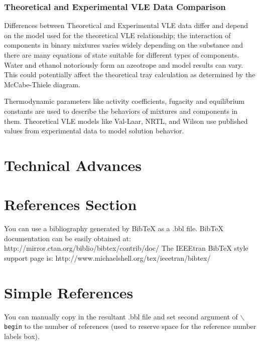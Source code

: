 \documentclass[lettersize,journal]{IEEEtran}
\begin{document}
\subsubsection{Theoretical and Experimental VLE Data Comparison}
Differences between Theoretical and Experimental VLE data differ and depend on the model used for the theoretical VLE relationship; the interaction of components in binary mixtures varies widely depending on the substance and there are many equations of state suitable for different types of components. Water and ethanol notoriously form an azeotrope and model results can vary. This could potentially affect the theoretical tray calculation as determined by the McCabe-Thiele diagram.

Thermodynamic parameters like activity coefficients, fugacity and equilibrium constants are used to describe the behaviors of mixtures and components in them. Theoretical VLE models like Val-Laar, NRTL, and Wilson use published values from experimental data to model solution behavior.
\section{Technical Advances}





\section{References Section}
You can use a bibliography generated by BibTeX as a .bbl file.
BibTeX documentation can be easily obtained at:
http://mirror.ctan.org/biblio/bibtex/contrib/doc/
The IEEEtran BibTeX style support page is:
http://www.michaelshell.org/tex/ieeetran/bibtex/

%
%
\section{Simple References}
You can manually copy in the resultant .bbl file and set second argument of $\backslash${\tt{begin}} to the number of references
(used to reserve space for the reference number labels box).
\end{document}
